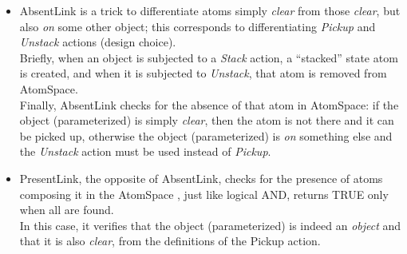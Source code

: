 \begin{itemize}
	\item AbsentLink is a trick to differentiate atoms simply \textit{clear} from those \textit{clear}, but also \textit{on} some other object; this corresponds to differentiating \textit{Pickup} and \textit{Unstack} actions (design choice). \\
Briefly, when an object is subjected to a \textit{Stack} action, a \enquote{stacked} state atom is created, and when it is subjected to \textit{Unstack}, that atom is removed from AtomSpace. \\
Finally, AbsentLink checks for the absence of that atom in AtomSpace: if the object (parameterized) is simply \textit{clear}, then the atom is not there and it can be picked up, otherwise the object (parameterized) is \textit{on} something else and the \textit{Unstack} action must be used instead of \textit{Pickup}. 
	\item PresentLink, the opposite of AbsentLink, checks for the presence of atoms composing it in the AtomSpace , just like logical AND, returns TRUE only when all are found. \\
In this case, it verifies that the object (parameterized) is indeed an \textit{object} and that it is also \textit{clear}, from the definitions of the Pickup action.
\end{itemize}

